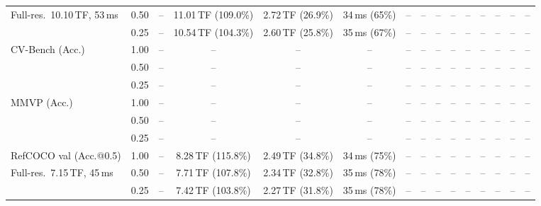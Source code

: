 \begin{table}[t]
{\begin{tabular}{l c | c c c c | c c c c | c c | c c c}
{\footnotesize Full-res.\ 10.10\,TF, 53\,ms} & 0.50 & -- & 11.01\,TF (109.0\%) & 2.72\,TF (26.9\%) & 34\,ms (65\%) & -- & -- & -- & -- & -- & -- & -- & -- & -- \\
 & 0.25 & -- & 10.54\,TF (104.3\%) & 2.60\,TF (25.8\%) & 35\,ms (67\%) & -- & -- & -- & -- & -- & -- & -- & -- & -- \\
\cmidrule(lr){1-15}
CV-Bench (Acc.) & 1.00 & -- & -- & -- & -- & -- & -- & -- & -- & -- & -- & -- & -- & -- \\
 & 0.50 & -- & -- & -- & -- & -- & -- & -- & -- & -- & -- & -- & -- & -- \\
 & 0.25 & -- & -- & -- & -- & -- & -- & -- & -- & -- & -- & -- & -- & -- \\
\cmidrule(lr){1-15}
MMVP (Acc.) & 1.00 & -- & -- & -- & -- & -- & -- & -- & -- & -- & -- & -- & -- & -- \\
 & 0.50 & -- & -- & -- & -- & -- & -- & -- & -- & -- & -- & -- & -- & -- \\
 & 0.25 & -- & -- & -- & -- & -- & -- & -- & -- & -- & -- & -- & -- & -- \\
\cmidrule(lr){1-15}
RefCOCO val (Acc.@0.5) & 1.00 & -- & 8.28\,TF (115.8\%) & 2.49\,TF (34.8\%) & 34\,ms (75\%) & -- & -- & -- & -- & -- & -- & -- & -- & -- \\
{\footnotesize Full-res.\ 7.15\,TF, 45\,ms} & 0.50 & -- & 7.71\,TF (107.8\%) & 2.34\,TF (32.8\%) & 35\,ms (78\%) & -- & -- & -- & -- & -- & -- & -- & -- & -- \\
 & 0.25 & -- & 7.42\,TF (103.8\%) & 2.27\,TF (31.8\%) & 35\,ms (78\%) & -- & -- & -- & -- & -- & -- & -- & -- & -- \\
\bottomrule
\end{tabular}}
\end{table}
